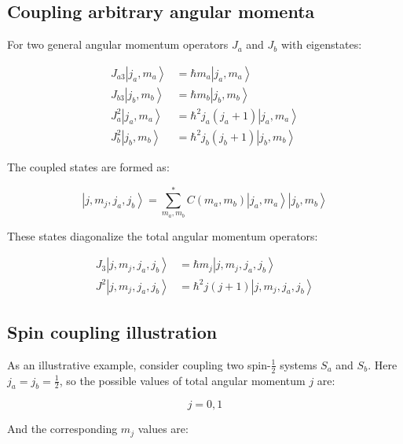 \documentclass[italian]{HKNdocument}
\begin{document}
\subsection{Coupling arbitrary angular momenta}
For two general angular momentum operators $J_{a}$ and $J_{b}$ with eigenstates:

\begin{align}
J_{a3}\left|j_{a}, m_{a}\right\rangle &= \hbar m_{a}\left|j_{a}, m_{a}\right\rangle \\
J_{b3}\left|j_{b}, m_{b}\right\rangle &= \hbar m_{b}\left|j_{b}, m_{b}\right\rangle \\
J_{a}^{2}\left|j_{a}, m_{a}\right\rangle &= \hbar^2 j_{a}\left(j_{a}+1\right)\left|j_{a}, m_{a}\right\rangle  \label{eq:11.53}\\
J_{b}^{2}\left|j_{b}, m_{b}\right\rangle &= \hbar^{2} j_{b}\left(j_{b}+1\right)\left|j_{b}, m_{b}\right\rangle
\end{align}

The coupled states are formed as:

\begin{equation}
\left|j, m_{j}, j_{a}, j_{b}\right\rangle=\sum_{m_{a}, m_{b}}^{*} C\left(m_{a}, m_{b}\right)\left|j_{a}, m_{a}\right\rangle\left|j_{b}, m_{b}\right\rangle \label{eq:11.54}
\end{equation}

These states diagonalize the total angular momentum operators:

\begin{align}
J_{3}\left|j, m_{j}, j_{a}, j_{b}\right\rangle &= \hbar m_{j}\left|j, m_{j}, j_{a}, j_{b}\right\rangle \\
J^{2}\left|j, m_{j}, j_{a}, j_{b}\right\rangle &= \hbar^2 j(j+1)\left|j, m_{j}, j_{a}, j_{b}\right\rangle \label{eq:11.55}
\end{align}

\subsection{Spin coupling illustration}
As an illustrative example, consider coupling two spin-$\frac{1}{2}$ systems $S_{a}$ and $S_{b}$. Here $j_{a}=j_{b}=\frac{1}{2}$, so the possible values of total angular momentum $j$ are:

\begin{equation}
j=0,1 \label{eq:11.56}
\end{equation}

And the corresponding $m_j$ values are:
\end{document}

